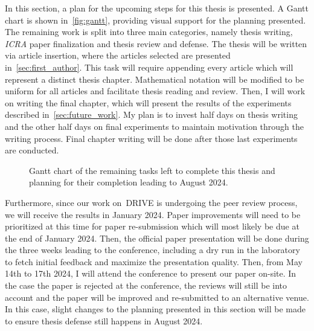 \documentclass[12pt,letterpaper,oneside]{article}
\begin{document}
In this section, a plan for the upcoming steps for this thesis is presented. 
A Gantt chart is shown in~\autoref{fig:gantt}, providing visual support for the planning presented.
The remaining work is split into three main categories, namely thesis writing, \emph{ICRA} paper finalization and thesis review and defense.
The thesis will be written via article insertion, where the articles selected are presented in~\autoref{sec:first_author}.
This task will require appending every article which will represent a distinct thesis chapter.
Mathematical notation will be modified to be uniform for all articles and facilitate thesis reading and review.
Then, I will work on writing the final chapter, which will present the results of the experiments described in~\autoref{sec:future_work}.
My plan is to invest half days on thesis writing and the other half days on final experiments to maintain motivation through the writing process.
Final chapter writing will be done after those last experiments are conducted.

\setlength{\fboxsep}{9pt}
\begin{figure}[h!]
	\centering
	
	\caption{Gantt chart of the remaining tasks left to complete this thesis and planning for their completion leading to August 2024.}
	\label{fig:gantt}
\end{figure}
\setlength{\fboxsep}{12pt}

Furthermore, since our work on~\ac{DRIVE} is undergoing the peer review process, we will receive the results in January 2024.
Paper improvements will need to be prioritized at this time for paper re-submission which will most likely be due at the end of January 2024.
Then, the official paper presentation will be done during the three weeks leading to the conference, including a dry run in the laboratory to fetch initial feedback and maximize the presentation quality.
Then, from May 14th to 17th 2024, I will attend the conference to present our paper on-site.
In the case the paper is rejected at the conference, the reviews will still be into account and the paper will be improved and re-submitted to an alternative venue.
In this case, slight changes to the planning presented in this section will be made to ensure thesis defense still happens in August 2024.
\end{document}
